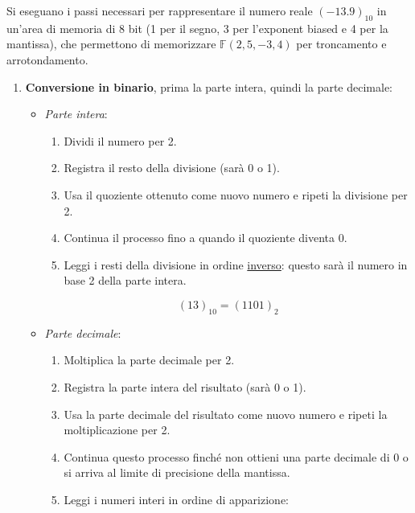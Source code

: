 \documentclass{article}
\begin{document}
\begin{example}
    Si eseguano i passi necessari per rappresentare il numero reale
    $(-13.9)_{10}$ in un'area di memoria di 8 bit (1 per il segno, 3 per
    l'exponent biased e 4 per la mantissa), che permettono di memorizzare
    $\mathbb{F}(2,5,-3,4)$ per troncamento e arrotondamento.
    \vskip 0.1in
    \begin{enumerate}
        \item \textbf{Conversione in binario}, prima la parte intera, quindi la parte decimale:
            \begin{itemize}
                \item \textit{Parte intera}:
                    \begin{enumerate}
                        \item Dividi il numero per 2.
                        \item Registra il resto della divisione (sarà 0 o 1).
                        \item Usa il quoziente ottenuto come nuovo numero e
                            ripeti la divisione per 2.
                        \item Continua il processo fino a quando il quoziente
                            diventa 0.
                        \item Leggi i resti della divisione in ordine
                            \underline{inverso}:
                            questo sarà il numero in base 2 della parte
                            intera.
                    \end{enumerate}
                    $$(13)_{10}=(1101)_2$$
                \item \textit{Parte decimale}:
                    \begin{enumerate}
                        \item Moltiplica la parte decimale per 2.
                        \item Registra la parte intera del risultato (sarà 0 o
                            1).
                        \item Usa la parte decimale del risultato come nuovo
                            numero e ripeti la moltiplicazione per 2.
                        \item Continua questo processo finché non ottieni una
                            parte decimale di 0 o si arriva al limite di
                            precisione della mantissa.
                        \item Leggi i numeri interi in ordine di apparizione:

\end{enumerate}
\end{itemize}
\end{enumerate}
\end{example}
\end{document}

